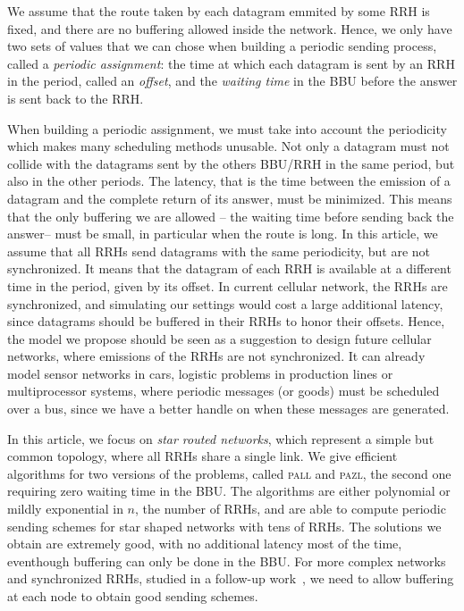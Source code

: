 \documentclass[a4paper,10pt]{article}
\newcommand\pazl{\textsc{pazl}\xspace}
\newcommand\pall{\textsc{pall}\xspace}
\begin{document}
We assume that the route taken by each datagram emmited by some RRH is fixed, and there are no buffering allowed inside the network. Hence, we only have two sets of values that we can chose when building a periodic sending process, called a \emph{periodic assignment}: the time at which each datagram is sent by an RRH in the period, called an \emph{offset}, and the \emph{waiting time} in the BBU before the answer is sent back to the RRH. 


When building a periodic assignment, we must take into account the periodicity which makes many scheduling methods unusable. Not only a datagram must not collide with the datagrams sent by the others BBU/RRH in the same period, but also in the other periods. The latency, that is the time between the emission of a datagram and the complete return of its answer, must be minimized. This means that the only buffering we are allowed -- the waiting time before sending back the answer-- must be small, in particular when the route is long.
 In this article, we assume that all RRHs send datagrams with the same periodicity, but are not synchronized. It means that the datagram of each RRH is available at a different time in the period, given by its offset.
 In current cellular network, the RRHs are synchronized, and simulating our settings would cost a large additional latency, since datagrams should be buffered in their RRHs to honor their offsets. 
Hence, the model we propose should be seen as a suggestion to design future cellular networks, where emissions of the RRHs are not synchronized. It can already model sensor networks in cars, logistic problems in production lines or multiprocessor systems, where periodic messages (or goods) must be scheduled over a bus, since we have a better handle on when these messages are generated.
 
In this article, we focus on \emph{star routed networks}, which represent a simple but common topology,
where all RRHs share a single link. We give efficient algorithms for two versions of the problems, called 
\pall and \pazl, the second one requiring zero waiting time in the BBU. The algorithms are either polynomial or mildly exponential in $n$, the number of RRHs, and are able to compute periodic sending schemes
for star shaped networks with tens of RRHs. The solutions we obtain are extremely good, with no 
additional latency most of the time, eventhough buffering can only be done in the BBU. For more complex networks and synchronized RRHs, studied in a follow-up work~\cite{guiraud2020synchronized}, we need to allow buffering at each node to obtain good sending schemes.
\end{document}
